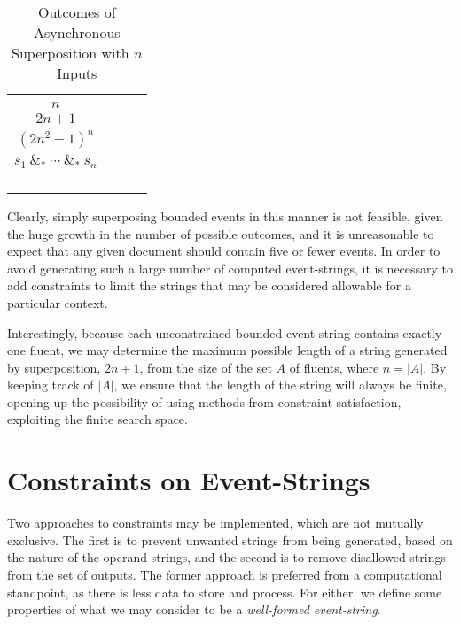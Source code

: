 \documentclass[a4paper,11pt,leqno]{article}
\makeatletter
\newcommand{\vph}[1]{\vphantom{#1}}
\newcommand{\eboxb}[1]{\fbox{$\vph{@}#1$}}
\makeatother
\begin{document}
\noindent
\begin{table}[h!]
	\centering
	\begin{tabular}{| c | c | c | c |}
		\hline
		\thead{\textbf{Number of events:}\\$n$} & 
		\thead{\textbf{Maximum length:}\\$2n + 1$} &
		\thead{\textbf{Number of possible strings:}\\$(2n^2 - 1)^n$} &
		\thead{\textbf{Number of outcomes from}\\$s_1 ~\&_*~ \cdots ~\&_*~ s_n$}
		\\
		\hline
		\thead{$2$} & 
		\thead{$5$} &
		\thead{$36$} &
		\thead{$13$}
		\\
		\hline
		\thead{$3$} & 
		\thead{$7$} & 
		\thead{$3,375$} &
		\thead{$409$}
		\\
		\hline
		\thead{$4$} & 
		\thead{$9$} &
		\thead{$61,456$} &
		\thead{$23,917$}
		\\
		\hline
		\thead{$5$} & 
		\thead{$11$} &
		\thead{$184,528,125$} &
		\thead{$2,244,361$}
		\\
		\hline
	\end{tabular}
	\caption{Outcomes of Asynchronous Superposition with $n$ Inputs}
	\label{table:combinatorics}
\end{table}
Clearly, simply superposing bounded events in this manner is not feasible, 
given the huge growth in the number of possible outcomes, and 
it is unreasonable to expect that any given document should contain five or 
fewer events. In order to avoid generating such a large number of computed 
event-strings, it is necessary to add constraints to limit the
strings that may be considered allowable for a particular context.

Interestingly, because each unconstrained bounded event-string 
\eboxb{}\eboxb{e}\eboxb{} contains exactly one fluent, we may determine the 
maximum possible length of a string generated by superposition, $2n + 1$, from 
the size of the set $A$ of fluents, where $n = |A|$. By keeping track of $|A|$, 
we ensure that the length of the string will always be finite, opening up the 
possibility of using methods from constraint satisfaction, exploiting the 
finite search space.

\section{Constraints on Event-Strings}\label{constraints}
Two approaches to constraints may be implemented, which are not mutually 
exclusive. The first is to prevent unwanted strings from being generated, based 
on the nature of the operand strings, and the second is to remove disallowed 
strings from the set of outputs. The former approach is preferred from a 
computational standpoint, as there is less data to store and process. For 
either, we define some properties of what we may consider to be a 
\textit{well-formed event-string}.
\end{document}
